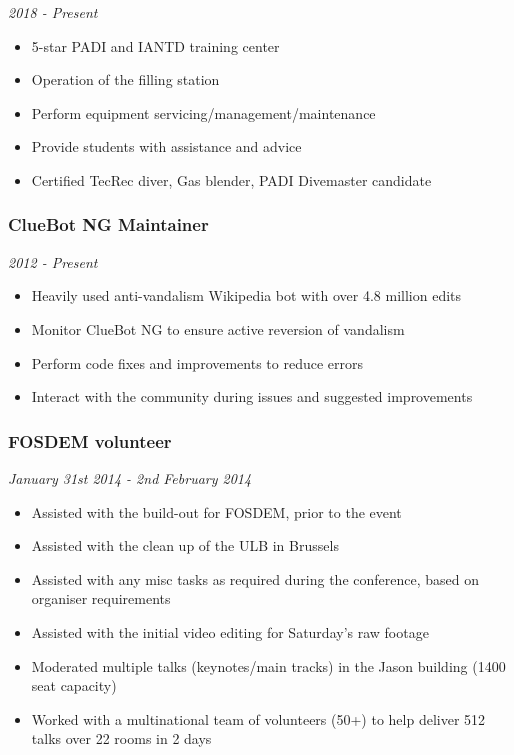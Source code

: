\emph{2018 - Present}

\begin{itemize}
\tightlist
\item
  5-star PADI and IANTD training center
\item
  Operation of the filling station
\item
  Perform equipment servicing/management/maintenance
\item
  Provide students with assistance and advice
\item
  Certified TecRec diver, Gas blender, PADI Divemaster candidate
\end{itemize}

\subsubsection{ClueBot NG Maintainer}\label{cluebot-ng-maintainer}

\emph{2012 - Present}

\begin{itemize}
\tightlist
\item
  Heavily used anti-vandalism Wikipedia bot with over 4.8 million edits
\item
  Monitor ClueBot NG to ensure active reversion of vandalism
\item
  Perform code fixes and improvements to reduce errors
\item
  Interact with the community during issues and suggested improvements
\end{itemize}

\subsubsection{FOSDEM volunteer}\label{fosdem-volunteer}

\emph{January 31st 2014 - 2nd February 2014}

\begin{itemize}
\tightlist
\item
  Assisted with the build-out for FOSDEM, prior to the event
\item
  Assisted with the clean up of the ULB in Brussels
\item
  Assisted with any misc tasks as required during the conference, based
  on organiser requirements
\item
  Assisted with the initial video editing for Saturday's raw footage
\item
  Moderated multiple talks (keynotes/main tracks) in the Jason building
  (1400 seat capacity)
\item
  Worked with a multinational team of volunteers (50+) to help deliver
  512 talks over 22 rooms in 2 days
\end{itemize}

